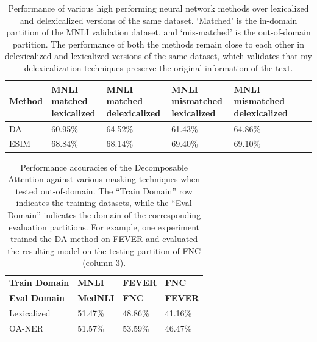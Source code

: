 \documentclass{article}
\begin{document}
\begin{table}[h]
\begin{center}
\begin{tabular}{|p{20mm}|p{20mm}|p{20mm}|p{20mm}|p{20mm}|p{20mm}|p{20mm}|}
\hline 
\textbf{Method} & \textbf{MNLI matched lexicalized }& \textbf{MNLI matched delexicalized } & \textbf{MNLI mismatched lexicalized } &\textbf{MNLI mismatched delexicalized } \\
 \hline
DA & {60.95\%} &{64.52\%} &{61.43\%}&{64.86\%}\\
\hline 
ESIM  & {68.84\%} &{68.14\%} &{69.40\%}&{69.10\%}\\
\hline 
\end{tabular}
\end{center}
\caption{Performance of various high performing neural network methods over lexicalized and delexicalized versions of the same dataset. `Matched' is the in-domain partition of the MNLI validation dataset, and `mis-matched' is the out-of-domain partition. The performance of both the methods remain close to each other in delexicalized and lexicalized versions of the same dataset, which validates that my  delexicalization techniques preserve the original information of the text. }

    \label{results}
\end{table}



\begin{table}[h]
\begin{center}
\begin{tabular}{|p{25mm}|p{12mm}|p{11mm}|p{10mm}|}
 \hline
\textbf{Train Domain} & \textbf{MNLI}& \textbf{FEVER}   & \textbf{FNC} \\ 
 \textbf{Eval Domain} & \textbf{MedNLI}& \textbf{{FNC}}   & \textbf{{FEVER}} \\ 
\hline
Lexicalized &51.47\%& {48.86\%} & {41.16\%} \\
OA-NER &51.57\%& 53.59\% & {46.47\%}\\
\hline
\end{tabular}
\end{center}
    \caption{ Performance accuracies of the Decomposable Attention against various masking techniques when tested out-of-domain. The ``Train Domain'' row indicates the training datasets, while the ``Eval Domain'' indicates the domain of the corresponding evaluation partitions. For example, one experiment trained the DA method on FEVER and evaluated the resulting model on the testing partition of FNC (column 3). }
    
    \label{results_outofdomain}
\end{table}
\end{document}
